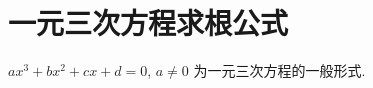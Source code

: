 \section{一元三次方程求根公式}
\begin{defination}
$ax^3 + bx^2 + cx + d = 0$, $a \ne 0$ 为一元三次方程的一般形式.
\end{defination}
